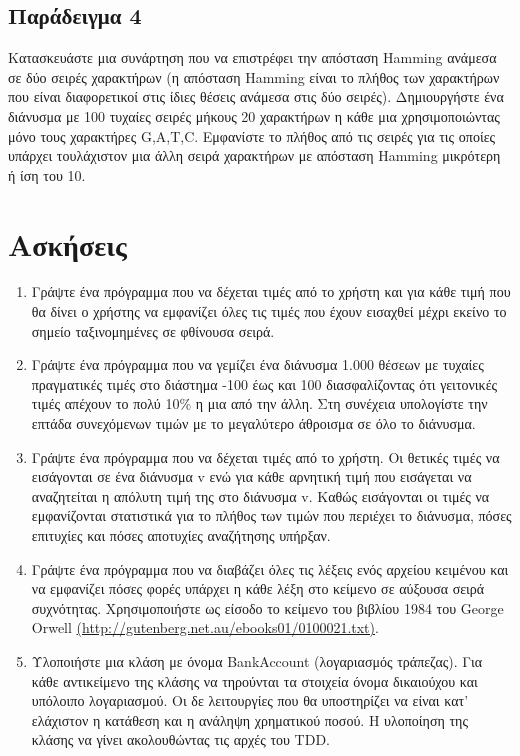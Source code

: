 \subsection{Παράδειγμα 4}
Κατασκευάστε μια συνάρτηση που να επιστρέφει την απόσταση Hamming ανάμεσα σε δύο σειρές χαρακτήρων (η απόσταση Hamming είναι το πλήθος των χαρακτήρων που είναι διαφορετικοί στις ίδιες θέσεις ανάμεσα στις δύο σειρές). Δημιουργήστε ένα διάνυσμα με 100 τυχαίες σειρές μήκους 20 χαρακτήρων η κάθε μια χρησιμοποιώντας μόνο τους χαρακτήρες G,A,T,C. Εμφανίστε το πλήθος από τις σειρές για τις οποίες υπάρχει τουλάχιστον μια άλλη σειρά χαρακτήρων με απόσταση Hamming μικρότερη ή ίση του 10.





\section{Ασκήσεις}
\begin{enumerate}
\item Γράψτε ένα πρόγραμμα που να δέχεται τιμές από το χρήστη και για κάθε τιμή που θα δίνει ο χρήστης να εμφανίζει όλες τις τιμές που έχουν εισαχθεί μέχρι εκείνο το σημείο ταξινομημένες σε φθίνουσα σειρά. 
\item Γράψτε ένα πρόγραμμα που να γεμίζει ένα διάνυσμα 1.000 θέσεων με τυχαίες πραγματικές τιμές στο διάστημα -100 έως και 100 διασφαλίζοντας ότι γειτονικές τιμές απέχουν το πολύ 10\% η μια από την άλλη. Στη συνέχεια υπολογίστε την επτάδα συνεχόμενων τιμών με το μεγαλύτερο άθροισμα σε όλο το διάνυσμα.
\item Γράψτε ένα πρόγραμμα που να δέχεται τιμές από το χρήστη. Οι θετικές τιμές να εισάγονται σε ένα διάνυσμα v ενώ για κάθε αρνητική τιμή που εισάγεται να αναζητείται η απόλυτη τιμή της στο διάνυσμα v. Καθώς εισάγονται οι τιμές να εμφανίζονται στατιστικά για το πλήθος των τιμών που περιέχει το διάνυσμα, πόσες επιτυχίες και πόσες αποτυχίες αναζήτησης υπήρξαν.
\item Γράψτε ένα πρόγραμμα που να διαβάζει όλες τις λέξεις ενός αρχείου κειμένου και να εμφανίζει πόσες φορές υπάρχει η κάθε λέξη στο κείμενο σε αύξουσα σειρά συχνότητας. Χρησιμοποιήστε ως είσοδο το κείμενο του βιβλίου 1984 του George Orwell \href{http://gutenberg.net.au/ebooks01/0100021.txt}{(http://gutenberg.net.au/ebooks01/0100021.txt)}.
\item Υλοποιήστε μια κλάση με όνομα BankAccount (λογαριασμός τράπεζας). Για κάθε αντικείμενο της κλάσης να τηρούνται τα στοιχεία όνομα δικαιούχου και υπόλοιπο λογαριασμού. Οι δε λειτουργίες που θα υποστηρίζει να είναι κατ' ελάχιστον η κατάθεση και η ανάληψη χρηματικού ποσού. Η υλοποίηση της κλάσης να γίνει ακολουθώντας τις αρχές του TDD.
\end{enumerate}

